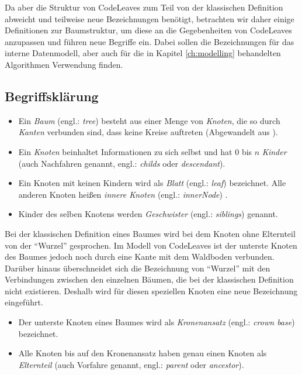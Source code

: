 Da aber die Struktur von CodeLeaves zum Teil von der klassischen Definition abweicht und teilweise neue Bezeichnungen benötigt, betrachten wir daher einige Definitionen zur Baumstruktur, um diese an die Gegebenheiten von CodeLeaves anzupassen und führen neue Begriffe ein. Dabei sollen die Bezeichnungen für das interne Datenmodell, aber auch für die in Kapitel \ref{ch:modelling} behandelten Algorithmen Verwendung finden.

\subsection{Begriffsklärung}

\begin{itemize}
  \item Ein \textit{Baum} (engl.: \textit{tree}) besteht aus einer Menge von \textit{Knoten}, die so durch \textit{Kanten} verbunden sind, dass keine Kreise auftreten (Abgewandelt aus \cite{gumm2009einfuehrung, ernst2016grundkurs}).
  \item Ein \textit{Knoten} beinhaltet Informationen zu sich selbst und hat $0$ bis $n$ \textit{Kinder} (auch Nachfahren genannt, engl.: \textit{childs} oder \textit{descendant}).
  \item Ein Knoten mit keinen Kindern wird als \textit{Blatt} (engl.: \textit{leaf}) bezeichnet. Alle anderen Knoten heißen \textit{innere Knoten} (engl.: \textit{innerNode}) \cite{gumm2009einfuehrung}.
  \item Kinder des selben Knotens werden \textit{Geschwister} (engl.: \textit{siblings}) genannt.
\end{itemize}

Bei der klassischen Definition eines Baumes wird bei dem Knoten ohne Elternteil von der "`Wurzel"' gesprochen. Im Modell von CodeLeaves ist der unterste Knoten des Baumes jedoch noch durch eine Kante mit dem Waldboden verbunden. Darüber hinaus überschneidet sich die Bezeichnung von "`Wurzel"' mit den Verbindungen zwischen den einzelnen Bäumen, die bei der klassischen Definition nicht existieren. Deshalb wird für diesen speziellen Knoten eine neue Bezeichnung eingeführt.

\begin{itemize}
  \item Der unterste Knoten eines Baumes wird als \textit{Kronenansatz} (engl.: \textit{crown base}) bezeichnet.
  \item Alle Knoten bis auf den Kronenansatz haben genau einen Knoten als \textit{Elternteil} (auch Vorfahre genannt, engl.: \textit{parent} oder \textit{ancestor}).
\end{itemize}

